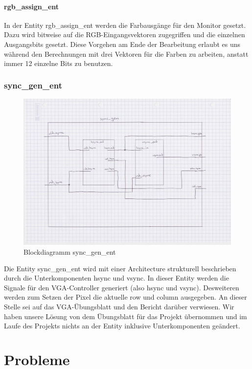 \documentclass[parskip=full]{scrartcl}
\begin{document}
			\subsection{rgb\_assign\_ent}
				In der Entity rgb\_assign\_ent werden die Farbausgänge für den Monitor gesetzt. Dazu wird bitweise auf die RGB-Eingangsvektoren zugegriffen und die einzelnen Ausgangsbits gesetzt. Diese Vorgehen am Ende der Bearbeitung erlaubt es uns während den Berechnungen mit drei Vektoren für die Farben zu arbeiten, anstatt immer 12 einzelne Bits zu benutzen.
		
		\section{sync\_gen\_ent}
			\begin{figure}[H]
				\centering
				\includegraphics[scale=0.1]{./bilder/Sync_gen.jpeg}
				\caption{Blockdiagramm sync\_gen\_ent}
			\end{figure}
		
			Die Entity sync\_gen\_ent wird mit einer Architecture strukturell beschrieben durch die Unterkomponenten hsync und vsync. In dieser Entity werden die Signale für den VGA-Controller generiert (also hsync und vsync). Desweiteren werden zum Setzen der Pixel die aktuelle row und column ausgegeben.
			An dieser Stelle sei auf das VGA-Übungsblatt und den Bericht darüber verwiesen. Wir haben unsere Lösung von dem Übungsblatt für das Projekt übernommen und im Laufe des Projekts nichts an der Entity inklusive Unterkomponenten geändert.
		
	\part{Probleme}
\end{document}
